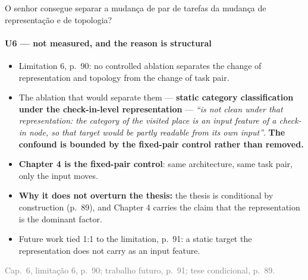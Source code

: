 \documentclass{beamer}
\begin{document}
\begin{frame}[noframenumbering]{O senhor consegue separar a mudança de par de tarefas da mudança de representação e de topologia?}
    \framesubtitle{U6 --- not measured, and the reason is structural}
    \hypertarget{u6}{}
    \small\begin{itemize}\setlength{\itemsep}{0pt}\setlength{\parskip}{0pt}
        \item Limitation 6, p.~90: no controlled ablation separates the change of representation and topology from the change of task pair.
        \item The ablation that would separate them --- \textbf{static category classification under the check-in-level representation} --- \textit{``is not clean under that representation: the category of the visited place is an input feature of a check-in node, so that target would be partly readable from its own input''}. \textbf{The confound is bounded by the fixed-pair control rather than removed.}
        \item \textbf{Chapter 4 is the fixed-pair control}: same architecture, same task pair, only the input moves.
        \item \textbf{Why it does not overturn the thesis:} the thesis is conditional by construction (p.~89), and Chapter 4 carries the claim that the representation is the dominant factor.
        \item Future work tied 1:1 to the limitation, p.~91: a static target the representation does not carry as an input feature.
    \end{itemize}
    \vfill
    {\scriptsize
    \begin{minipage}[b]{0.775\linewidth}\raggedright\textcolor{gray}{Cap.~6, limitação 6, p.~90; trabalho futuro, p.~91; tese condicional, p.~89.}\end{minipage}\hfill
    \begin{minipage}[b]{0.20\linewidth}\raggedleft \hyperlink{b0}{}\end{minipage}}
\end{frame}
\end{document}

